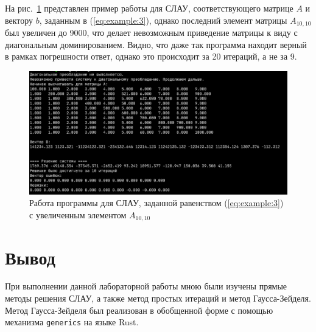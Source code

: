 На рис.~\ref{fig:example:4} представлен пример работы для СЛАУ, соответствующего матрице \(A\) и вектору \(b\), заданным в (\ref{eq:example:3}),
однако последний элемент матрицы \(A_{10,10}\) был увеличен до 9000, что делает невозможным приведение матрицы к виду с диагональным доминированием.
Видно, что даже так программа находит верный в рамках погрешности ответ, однако это происходит за 20 итераций, а не за  9.

\begin{figure}[H]
	\includegraphics[width=\textwidth]{./img/test4.png}
	\caption{Работа программы для СЛАУ, заданной равенством (\ref{eq:example:3}) с увеличенным элементом \(A_{10,10}\)}
	\label{fig:example:4}
\end{figure}



\section{Вывод}
При выполнении данной лабораторной работы мною были изучены прямые методы
решения СЛАУ, а также метод простых итераций и метод Гаусса-Зейделя.
Метод Гаусса-Зейделя был реализован в обобщенной форме с помощью механизма \texttt{generics} на языке Rust.
